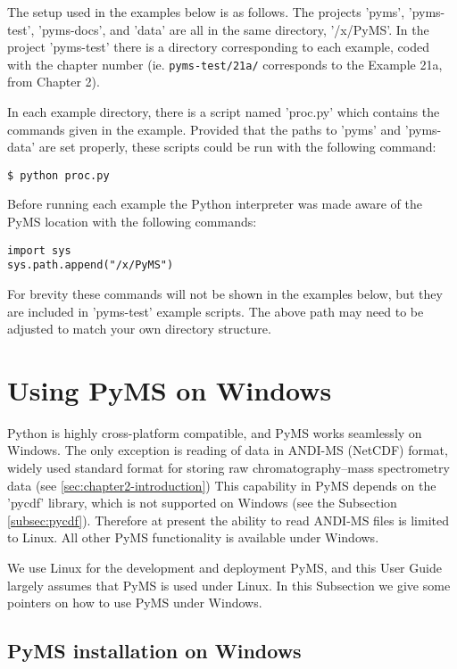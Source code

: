 The setup used in the examples below is as follows. The projects 'pyms',
'pyms-test', 'pyms-docs', and 'data' are all in the same directory,
'/x/PyMS'. In the project 'pyms-test' there is a directory corresponding
to each example, coded with the chapter number (ie. {\tt pyms-test/21a/}
corresponds to the Example 21a, from Chapter 2).

In each example directory, there is a script named 'proc.py' which
contains the commands given in the example.  Provided that the paths
to 'pyms' and 'pyms-data' are set properly, these scripts could be
run with the following command:

\begin{verbatim}
$ python proc.py
\end{verbatim}

Before running each example the Python interpreter was made aware of
the PyMS location with the following commands:

\begin{verbatim}
import sys
sys.path.append("/x/PyMS")
\end{verbatim}

For brevity these commands will not be shown in the examples below,
but they are included in 'pyms-test' example scripts.  The above
path may need to be adjusted to match your own directory structure.

\section{\label{sec:pyms-windows}Using PyMS on Windows}

Python is highly cross-platform compatible, and PyMS works seamlessly
on Windows. The only exception is reading of data in ANDI-MS (NetCDF)
format, widely used standard format for storing raw
chromatography--mass spectrometry data (see \ref{sec:chapter2-introduction})
This capability in PyMS depends on the 'pycdf' library, which is not
supported on Windows (see the Subsection \ref{subsec:pycdf}). Therefore
at present the ability to read ANDI-MS files is limited to Linux. All
other PyMS functionality is available under Windows.

We use Linux for the development and deployment PyMS, and this User
Guide largely assumes that PyMS is used under Linux. In this Subsection
we give some pointers on how to use PyMS under Windows.

\subsection{PyMS installation on Windows}

